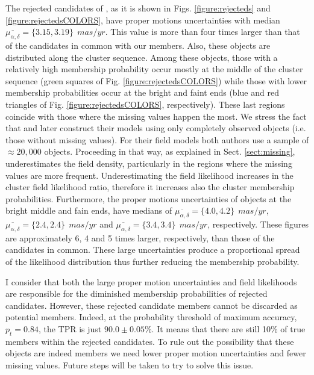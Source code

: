 The rejected candidates of \citet{Bouy2015}, as it is shown in Figs. \ref{figure:rejecteds} and \ref{figure:rejectedsCOLORS}, have proper motions uncertainties with median $\overline{\mu_{\alpha,\delta}}=\{3.15,3.19\} \ \ mas/yr$. This value is more than four times larger than that of the candidates in common with our members. Also, these objects are distributed along the cluster sequence. Among these objects, those with a relatively high membership probability occur mostly at the middle of the cluster sequence (green squares of Fig. \ref{figure:rejectedsCOLORS}) while those with lower membership probabilities occur at the bright and faint ends (blue and red triangles of Fig. \ref{figure:rejectedsCOLORS}, respectively). These last regions coincide with those where the missing values happen the most. We stress the fact that \citet{Sarro2014} and later \citet{Bouy2015} construct their models using only completely observed objects (i.e. those without missing values). For their field models both authors use a sample of $\approx 20,000$ objects. Proceeding in that way, as explained in Sect. \ref{sect:missing}, underestimates the field density, particularly in the regions where the missing values are more frequent. Underestimating the field likelihood increases in the cluster field likelihood ratio, therefore it increases also the cluster membership probabilities. Furthermore, the proper motions uncertainties of objects at the bright middle and fain ends, have medians of $\overline{\mu_{\alpha,\delta}}=\{4.0,4.2\} \ \ mas/yr$, $\overline{\mu_{\alpha,\delta}}=\{2.4,2.4\} \ \ mas/yr$ and $\overline{\mu_{\alpha,\delta}}=\{3.4,3.4\} \ \ mas/yr$, respectively. These figures are approximately 6, 4 and 5 times larger, respectively, than those of the candidates in common. These large uncertainties produce a proportional spread of the likelihood distribution thus further reducing the membership probability.

I consider that both the large proper motion uncertainties and field likelihoods are responsible for the diminished membership probabilities of \citet{Bouy2015} rejected candidates. However, these rejected candidate members cannot be discarded as potential members. Indeed, at the probability threshold of maximum accuracy, $p_t=0.84$, the TPR is just $90.0\pm0.05$\%. It means that there are still 10\% of true members within the rejected candidates. To rule out the possibility that these objects are indeed members we need lower proper motion uncertainties and fewer missing values. Future steps will be taken to try to solve this issue.

